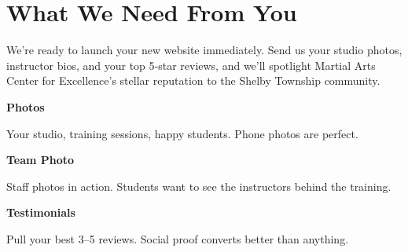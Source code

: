 \documentclass[11pt,letterpaper]{article}
\begin{document}
\vspace{0.2em}

\section*{What We Need From You}

We’re ready to launch your new website immediately. Send us your studio photos, instructor bios, and your top 5‑star reviews, and we’ll spotlight Martial Arts Center for Excellence’s stellar reputation to the Shelby Township community.

\vspace{0.12em}

\noindent\begin{minipage}[t]{0.48\textwidth}
\begin{tcolorbox}[colframe=accent-teal, boxrule=1pt, left=0.7em, right=0.7em, top=0.5em, bottom=0.5em, arc=4pt, boxsep=0pt]
{\bfseries\small\color{accent-teal}Photos}

\vspace{0.15em}

{\small Your studio, training sessions, happy students. Phone photos are perfect.}
\end{tcolorbox}

\vspace{0.1em}

\begin{tcolorbox}[colframe=accent-teal, boxrule=1pt, left=0.7em, right=0.7em, top=0.5em, bottom=0.5em, arc=4pt, boxsep=0pt]
{\bfseries\small\color{accent-teal}Team Photo}

\vspace{0.15em}

{\small Staff photos in action. Students want to see the instructors behind the training.}
\end{tcolorbox}

\vspace{0.1em}

\begin{tcolorbox}[colframe=accent-teal, boxrule=1pt, left=0.7em, right=0.7em, top=0.5em, bottom=0.5em, arc=4pt, boxsep=0pt]
{\bfseries\small\color{accent-teal}Testimonials}

\vspace{0.15em}

{\small Pull your best 3–5 reviews. Social proof converts better than anything.}
\end{tcolorbox}
\end{minipage}
\hfill
\end{document}

